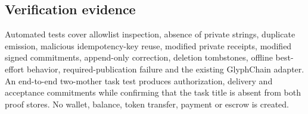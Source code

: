 \subsection{Verification evidence}

Automated tests cover allowlist inspection, absence of private strings, duplicate
emission, malicious idempotency-key reuse, modified private receipts, modified
signed commitments, append-only correction, deletion tombstones, offline
best-effort behavior, required-publication failure and the existing GlyphChain
adapter.  An end-to-end two-mother task test produces authorization, delivery and
acceptance commitments while confirming that the task title is absent from both
proof stores.  No wallet, balance, token transfer, payment or escrow is created.
